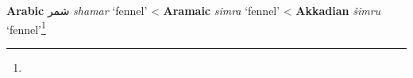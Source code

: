 \begin{etymology}\label{ety:shamar}
\textbf{Arabic} { شمر} \textit{shamar} `fennel'
< \textbf{Aramaic} \textit{simra} `fennel'
< \textbf{Akkadian} {} \textit{šimru} `fennel'\footnote{}
\end{etymology}